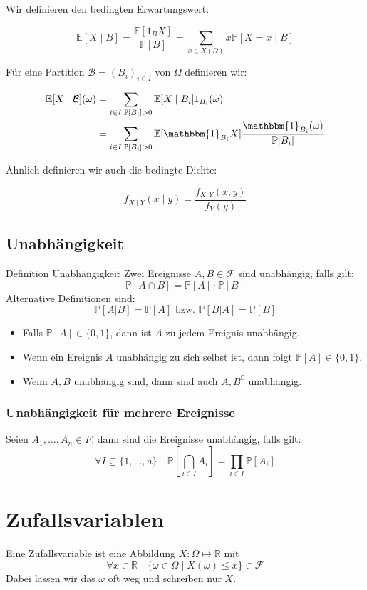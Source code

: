 \documentclass[a4paper,10pt]{article}
\def\R{\mathbb{R}}
\def\P{\mathbb{P}}
\def\F{\mathcal{F}}
\def\E{\mathbb{E}}
\begin{document}
Wir definieren den bedingten Erwartungswert:

$$
	\E[X \mid B] = \frac{\E[1_B X]}{\P[B]} = \sum_{x \in X(\Omega)} x \P[X = x \mid B]
$$

Für eine Partition $\mathcal{B} = (B_i)_{i \in I}$ von $\Omega$ definieren wir:

\begin{align*}
	\E[X \mid \mathcal{B}](\omega) & = \sum_{i \in I, \P[B_i] > 0} \E[X \mid B_i] 1_{B_i}(\omega)\\ 
	& = \sum_{i \in I, \P[B_i] > 0} \E[\mathbbm{1}_{B_i} X] \frac{\mathbbm{1}_{B_i}(\omega)}{\P[B_i]}
\end{align*}

Ähnlich definieren wir auch die bedingte Dichte:

$$
	f_{X \mid Y}(x \mid y) = \frac{f_{X,Y}(x,y)}{f_Y(y)}
$$

\subsection{Unabhängigkeit}
\begin{mainbox}{Definition Unabhängigkeit}
	Zwei Ereignisse \(A, B\in \F\) sind unabhängig, falls gilt:
	\[\P[A\cap B] = \P[A] \cdot \P[B]\]
	Alternative Definitionen sind:
	\[\P[A|B] = \P[A] \text{ bzw. } \P[B|A] = \P[B]\]
\end{mainbox}
\begin{itemize}
	\item Falls \(\P[A] \in \{0,1\}\), dann ist \(A\) zu jedem Ereignis unabhängig.
	\item Wenn ein Ereignis \(A\) unabhängig zu sich selbst ist, dann folgt \(\P[A] \in \{0,1\}\).
	\item Wenn \(A, B\) unabhängig sind, dann sind auch \(A, B^\complement\) unabhängig.
\end{itemize}
\subsubsection*{Unabhängigkeit für mehrere Ereignisse}
Seien \(A_1, \ldots, A_n \in F\), dann sind die Ereignisse unabhängig, falls gilt:
\[\forall I \subseteq \{1, \ldots, n\} \quad \P \left[ \bigcap_{i\in I}A_i \right] = \prod_{i\in I} \P[A_i]\]

\section{Zufallsvariablen}
Eine Zufallsvariable ist eine Abbildung \(X: \Omega \mapsto \R\) mit
\[\forall x \in \R \quad \{\omega \in \Omega \mid X(\omega) \leq x\} \in \F\]
Dabei lassen wir das \(\omega\) oft weg und schreiben nur \(X\).
\end{document}
